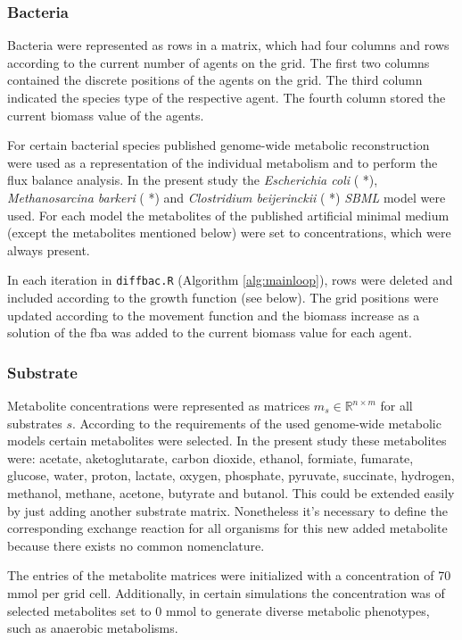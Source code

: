 \subsubsection{Bacteria}
Bacteria were represented as rows in a matrix, which had four columns and rows according to the current number of agents on the grid. The first two columns contained the discrete positions of the agents on the grid. The third column indicated the species type of the respective agent. The fourth column stored the current biomass value of the agents.

For certain bacterial species published genome-wide metabolic reconstruction were used as a representation of the individual metabolism and to perform the flux balance analysis. In the present study the \emph{Escherichia coli} ( *), \emph{Methanosarcina barkeri} ( *) and \emph{Clostridium beijerinckii} ( *) \textit{SBML} model were used. For each model the metabolites of the published artificial minimal medium (except the metabolites mentioned below) were set to concentrations, which were always present.

In each iteration in \texttt{diffbac.R} (Algorithm \hyperref[alg:mainloop]{\ref{alg:mainloop}}), rows were deleted and included according to the growth function (see below). The grid positions were updated according to the movement function and the biomass increase as a solution of the fba was added to the current biomass value for each agent.

\subsubsection{Substrate}
Metabolite concentrations were represented as matrices $m_s \in \mathbb{R}^{n \times m}$ for all substrates $s$. According to the requirements of the used genome-wide metabolic models certain metabolites were selected. In the present study these metabolites were: acetate, aketoglutarate, carbon dioxide, ethanol, formiate, fumarate, glucose, water, proton, lactate, oxygen, phosphate, pyruvate, succinate, hydrogen, methanol, methane, acetone, butyrate and butanol.
This could be extended easily by just adding another substrate matrix.
Nonetheless it's necessary to define the corresponding exchange reaction for all organisms for this new added metabolite because there exists no common nomenclature.

The entries of the metabolite matrices were initialized with a concentration of 70 mmol per grid cell. Additionally, in certain simulations the concentration was of selected metabolites set to 0 mmol to generate diverse metabolic phenotypes, such as anaerobic metabolisms.


